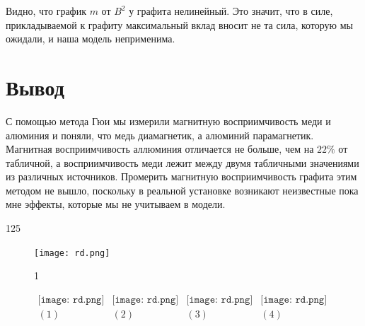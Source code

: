 Видно, что график $m$ от $B^2$ у графита нелинейный. Это значит, что в силе, прикладываемой к графиту максимальный вклад вносит не та сила, которую мы ожидали, и наша модель неприменима.

\section*{Вывод}
С помощью метода Гюи мы измерили магнитную восприимчивость меди и алюминия и поняли, что медь диамагнетик, а алюминий парамагнетик. Магнитная восприимчивость аллюминия отличается не больше, чем на $22\%$ от табличной, а восприимчивость меди лежит между двумя табличными значениями из различных источников. Промерить магнитную восприимчивость графита этим методом не вышло, поскольку в реальной установке возникают неизвестные пока мне эффекты, которые мы не учитываем в модели.



125





\lipsum[1-4]
\begin{figure}
\centering
\texttt{[image: rd.png]}
\caption{1}
\end{figure}
\lipsum[1-6]


\begin{figure}[h]
\begin{center}$
\begin{array}{cccc}
\texttt{[image: rd.png]}&
\texttt{[image: rd.png]}&
\texttt{[image: rd.png]}&
\texttt{[image: rd.png]}\\
(1) & (2) & (3) & (4)
\end{array}$
\end{center}
\end{figure}
